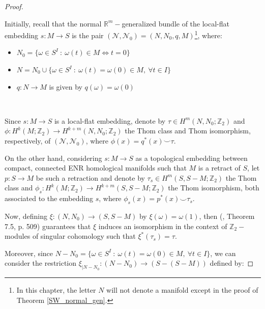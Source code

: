 \documentclass[12pt,oneside]{book}
\newcommand{\R}{\mathbb{R}}
\newcommand{\Z}{\mathbb{Z}}
\begin{document}
    \begin{proof}

        \

        Initially, recall that the normal $\R^{m}-$generalized bundle of the local-flat embedding $s: M \to S$ is the pair 
        $(\mathcal{N}, \mathcal{N}_{0}) = (N, N_{0}, q, M)$\footnote{In this chapter, the letter $N$ will not denote a manifold except in the 
        proof of Theorem \ref{SW_normal_gen}.}, where:

        	\begin{itemize}
        		\item $N_{0} = \{ \omega \in S^{I} \ : \ \omega(t) \in M \Leftrightarrow t = 0 \}$
        		\item $N = N_{0} \cup \{ \omega \in S^{I} \ : \ \omega(t) = \omega(0) \in M, \ \forall t \in I \}$
        		\item $q: N \to M$ is given by $q(\omega) = \omega(0)$
        	\end{itemize}

            \

        Since $s: M \to S$ is a local-flat embedding, denote by $\tau \in H^{m}(N, N_{0}; \Z_{2})$ and 
        $\phi: H^{k}(M; \Z_{2}) \to H^{k+m}(N, N_{0}; \Z_{2})$ the Thom class and Thom isomorphism, respectively, of 
        $(\mathcal{N}, \mathcal{N}_{0})$, where $\phi(x) = q^{*}(x) \smile \tau$.

        On the other hand, considering $s: M \to S$ as a topological embedding between compact, connected 
        ENR homological manifolds such that $M$ is a retract of $S$, let $p: S \to M$ be such a retraction and 
        denote by $\tau_{s} \in H^{m}(S, S - M; \Z_{2})$ the Thom class and 
        $\phi_{s}: H^{k}(M; \Z_{2}) \to H^{k+m}(S, S - M; \Z_{2})$ the Thom isomorphism, both associated to the 
        embedding $s$, where $\phi_{s}(x) = p^{*}(x) \smile \tau_{s}$.

        Now, defining $\xi: (N, N_{0}) \to (S, S - M)$ by $\xi(\omega) = \omega(1)$, then (\cite{fadell_1}, Theorem 7.5, p. 509) guarantees 
        that $\xi$ induces an isomorphism in the context of $\Z_{2}-$modules of singular cohomology such that $\xi^{*}(\tau_{s}) = \tau$.

        Moreover, since $N - N_{0} = \{ \omega \in S^{I} \ : \ \omega(t) = \omega(0) \in M, \ \forall t \in I \}$, we can consider the 
        restriction $\xi_{|N - N_{0}}: (N - N_{0}) \to (S - (S - M))$ defined by:


\end{proof}
\end{document}
